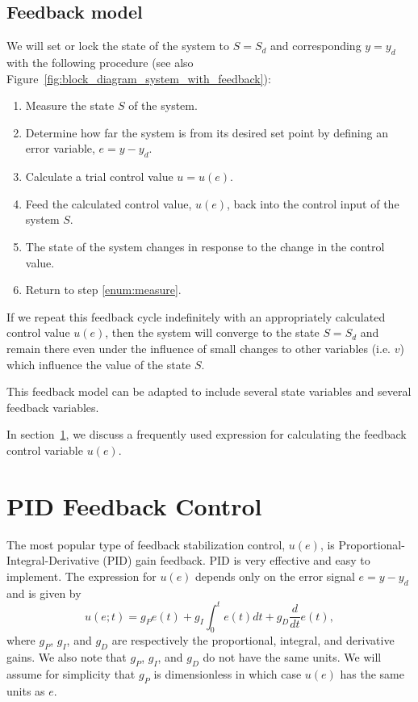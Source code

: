 \documentclass{article}
\begin{document}
\subsection{Feedback model}
We will set or lock the state of the system to $S = S_d$ and corresponding $y = y_d$ with the following procedure (see also Figure~\ref{fig:block_diagram_system_with_feedback}):
\begin{enumerate}
\item \label{enum:measure} Measure the state $S$ of the system.
\item Determine how far the system is from its desired set point by defining an error variable, $e = y - y_d$.
\item Calculate a trial control value $u = u(e)$.
\item Feed the calculated control value, $u(e)$, back into the control input of the system $S$.
\item \label{enum:change} The state of the system changes in response to the change in the control value.
\item Return to step \ref{enum:measure}.
\end{enumerate}

If we repeat this feedback cycle indefinitely with an appropriately calculated control value $u(e)$, then the system will converge to the state $S = S_d$ and remain there even under the influence of small changes to other variables (i.e. $v$) which influence the value of the state $S$.

This feedback model can be adapted to include several state variables and several feedback variables.

In section~\ref{sec:PID_feedback_control}, we discuss a frequently used expression for calculating the feedback control variable $u(e)$.


\section{PID Feedback Control}
\label{sec:PID_feedback_control}
The most popular type of feedback stabilization control, $u(e)$, is Proportional-Integral-Derivative (PID) gain feedback. PID is very effective and easy to implement. The expression for $u(e)$ depends only on the error signal $e = y - y_d$ and is given by
\begin{equation}
u(e;t) = g_P e(t) + g_I \int_0^t e(t)dt + g_D \frac{d}{dt} e(t),
\end{equation}
where $g_P$, $g_I$, and $g_D$ are respectively the proportional, integral, and derivative gains. We also note that $g_P$, $g_I$, and $g_D$ do not have the same units. We will assume for simplicity that $g_P$ is dimensionless in which case $u(e)$ has the same units as $e$.
\end{document}
